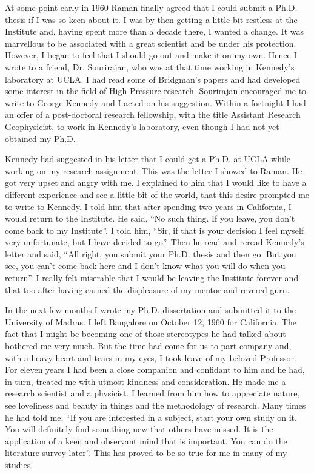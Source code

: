 At some point early in 1960 Raman finally agreed that I could
submit a Ph.D. thesis if I was so keen about it. I was by then
getting a little bit restless at the Institute and, having spent more
than a decade there, I wanted a change. It was marvellous to be
associated with a great scientist and be under his protection.
However, I began to feel that I should go out and make it
on my own. Hence I wrote to a friend, Dr. Sourirajan, who was
at that time working in Kennedy's laboratory at UCLA. I had
read some of Bridgman's papers and had developed some interest
in the field of High Pressure research. Sourirajan encouraged
me to write to George Kennedy and I acted on his suggestion.
Within a fortnight I had an offer of a post-doctoral research
fellowship, with the title Assistant Research Geophysicist, to
work in Kennedy's laboratory, even though I had not yet obtained
my Ph.D.

Kennedy had suggested in his letter that I could get a Ph.D.
at UCLA while working on my research assignment. This was
the letter I showed to Raman. He got very upset and angry with
me. I explained to him that I would like to have a different
experience and see a little bit of the world, that this desire
prompted me to write to Kennedy. I told him that after spending
two years in California, I would return to the Institute. He said,
``No such thing. If you leave, you don't come back to my
Institute''. I told him, ``Sir, if that is your decision I feel myself
very unfortunate, but I have decided to go''. Then he read and
reread Kennedy's letter and said, ``All right, you submit your
Ph.D. thesis and then go. But you see, you can't come back here
and I don't know what you will do when you return''. I really
felt miserable that I would be leaving the Institute forever and that
too after having earned the displeasure of my mentor and
revered guru.

In the next few months I wrote my Ph.D. dissertation and
submitted it to the University of Madras. I left Bangalore on
October 12, 1960 for California. The fact that I might be
becoming one of those stereotypes he had talked about bothered
me very much. But the time had come for us to part company
and, with a heavy heart and tears in my eyes, I took leave of
my beloved Professor. For eleven years I had been a close
companion and confidant to him and he had, in turn, treated
me with utmost kindness and consideration. He made me a
research scientist and a physicist. I learned from him how to
appreciate nature, see loveliness and beauty in things and
the methodology of research. Many times he had told me,
``If you are interested in a subject, start your own study on it.
You will definitely find something new that others have missed.
It is the application of a keen and observant mind that is
important. You can do the literature survey later''. This has
proved to be so true for me in many of my studies.

